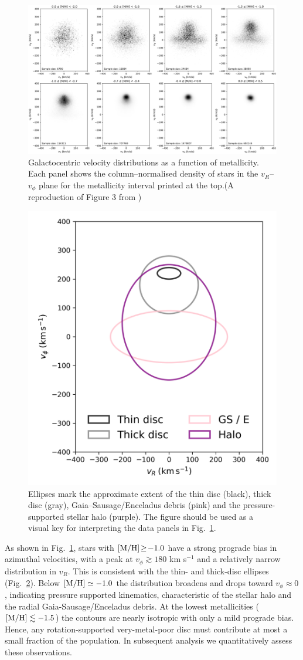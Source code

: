 \documentclass[a4paper,12pt]{article}
\begin{document}
\begin{figure}
  \centering
  \includegraphics[width=\textwidth]
                   {../figures/vphi_metallicity_histograms.png}
  \caption{Galactocentric velocity distributions as a function of metallicity.
           Each panel shows the column–normalised density of stars in the
           $v_R$–$v_\phi$ plane for the metallicity interval printed at the
           top.(A reproduction of Figure 3 from \citet{zhang2024existencemetalpoordiscmilky})
           }
  \label{fig:vRvphi_bins}
\end{figure}

\begin{figure}
  \centering
  \includegraphics[width=0.3\columnwidth]
                   {../figures/reference_velocity_ellipses.png}
  \caption{Ellipses mark the approximate extent of the thin disc
           (black), thick disc (gray),
           Gaia–Sausage/Enceladus debris (pink) and the
           pressure-supported stellar halo (purple).
           The figure should be used as a visual key for interpreting the data panels
           in Fig.~\ref{fig:vRvphi_bins}.
           }
  \label{fig:ref_ellipses}
\end{figure}

As shown in Fig.~\ref{fig:vRvphi_bins}, stars with
${\rm[M/H]}\!\geq\!-1.0$ have a strong prograde bias in azimuthal velocities, 
with a peak at $v_\phi\!\gtrsim\!180$ km s$^{-1}$ and a relatively narrow
distribution in $v_R$. This is consistent with 
the thin- and thick-disc ellipses (Fig.~\ref{fig:ref_ellipses}). 
Below ${\rm[M/H]}\simeq-1.0$ the distribution broadens and
drops toward $v_\phi\!\approx\!0$, indicating
pressure supported kinematics, characteristic of the stellar halo and
the radial Gaia-Sausage/Enceladus debris.  At the lowest
metallicities (${\rm[M/H]}\lesssim-1.5$) the contours are nearly
isotropic with only a mild prograde bias.  Hence, any
rotation-supported very-metal-poor disc must contribute at most a
small fraction of the population. In subsequent analysis we quantitatively assess
these observations.
\end{document}
